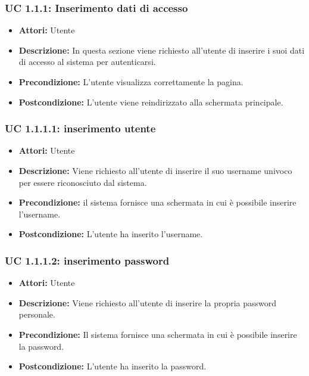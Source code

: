 \subsubsection{UC 1.1.1: Inserimento dati di accesso}

\begin{itemize}
\item \textbf{Attori:} Utente
\item \textbf{Descrizione:} In questa sezione viene richiesto all'utente di inserire i suoi dati di accesso al sistema per autenticarsi.
\item \textbf{Precondizione:} L'utente visualizza correttamente la pagina.
\item \textbf{Postcondizione:} L'utente viene reindirizzato alla schermata principale.
\end{itemize}

\subsubsection{UC 1.1.1.1: inserimento utente}

\begin{itemize}
\item \textbf{Attori:} Utente
\item \textbf{Descrizione:} Viene richiesto all'utente di inserire il suo username univoco per essere riconosciuto dal sistema. 
\item \textbf{Precondizione:} il sistema fornisce una schermata in cui è possibile inserire l’username.
\item \textbf{Postcondizione:} L'utente ha inserito l'username.
\end{itemize}

\subsubsection{UC 1.1.1.2: inserimento password}

\begin{itemize}
\item \textbf{Attori:} Utente
\item \textbf{Descrizione:} Viene richiesto all'utente di inserire la propria password personale.
\item \textbf{Precondizione:} Il sistema fornisce una schermata in cui è possibile inserire la password.
\item \textbf{Postcondizione:} L'utente ha inserito la password.
\end{itemize}

